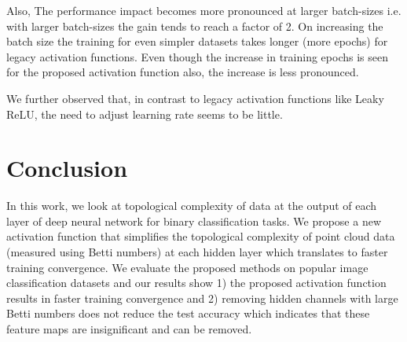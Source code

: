 \documentclass[wcp]{jmlr}
\begin{document}
Also, The performance impact becomes more pronounced at larger batch-sizes i.e. with larger batch-sizes the gain tends to reach a factor of 2. On increasing the batch size the training for even simpler datasets takes longer (more epochs) for legacy activation functions. Even though the increase in training epochs  is seen for the proposed activation function also, the increase is less pronounced.

We further observed that,  in contrast to legacy activation functions like Leaky ReLU,  the need to adjust learning rate seems to be little.

\section{Conclusion}
In this work, we look at topological complexity of data at the output of each layer of deep neural network for binary classification tasks. We propose a new activation function that simplifies the topological complexity of point cloud data (measured using Betti numbers)  at each hidden layer which translates to faster training convergence. We evaluate the proposed methods on popular image classification datasets and our results show 1) the proposed activation function results in faster training convergence and 2) removing hidden channels with large Betti numbers does not reduce the test accuracy which indicates that these feature maps are insignificant and can be removed.


%


%
%
%
%
\end{document}
